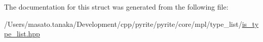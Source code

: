 The documentation for this struct was generated from the following file\+:\begin{DoxyCompactItemize}
\item 
/\+Users/masato.\+tanaka/\+Development/cpp/pyrite/pyrite/core/mpl/type\+\_\+list/\mbox{\hyperlink{core_2mpl_2type__list_2is__type__list_8hpp}{is\+\_\+type\+\_\+list.\+hpp}}\end{DoxyCompactItemize}
